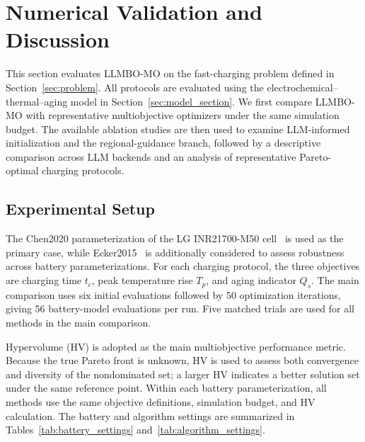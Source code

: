 \section{Numerical Validation and Discussion}
\label{sec:experiments}

This section evaluates LLMBO-MO on the fast-charging problem defined in
Section~\ref{sec:problem}. All protocols are evaluated using the
electrochemical--thermal--aging model in Section~\ref{sec:model_section}. We
first compare LLMBO-MO with representative multiobjective optimizers under the
same simulation budget. The available ablation studies are then used to
examine LLM-informed initialization and the regional-guidance branch, followed
by a descriptive comparison across LLM backends and an analysis of
representative Pareto-optimal charging protocols.

\subsection{Experimental Setup}

The Chen2020 parameterization of the LG INR21700-M50 cell~\cite{ref8} is used
as the primary case, while Ecker2015~\cite{ref9} is additionally considered to assess robustness across battery parameterizations.
For each charging protocol, the three objectives are
charging time $t_c$, peak temperature rise $T_p$, and aging indicator $Q_s$.
The main comparison uses six initial evaluations followed by 50 optimization
iterations, giving 56 battery-model evaluations per run. Five matched trials
are used for all methods in the main comparison.

Hypervolume (HV) is adopted as the main multiobjective performance metric.
Because the true Pareto front is unknown, HV is used to assess both convergence
and diversity of the nondominated set; a larger HV indicates a better solution
set under the same reference point. Within each battery parameterization, all
methods use the same objective definitions, simulation budget, and HV
calculation. The battery and algorithm settings are summarized in
Tables~\ref{tab:battery_settings} and~\ref{tab:algorithm_settings}.


